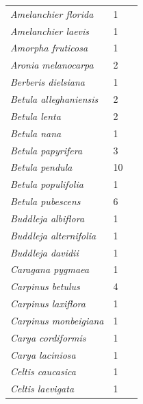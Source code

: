 \documentclass[11pt]{article}
\begin{document}
\begin{longtable}{p{}p{}p{}}
  \emph{Amelanchier florida} &   1 & \emph{\citep{zohner2016}} \\ 
  \emph{Amelanchier laevis} &   1 & \emph{\citep{zohner2016}} \\ 
  \emph{Amorpha fruticosa} &   1 & \emph{\citep{Laube:2014a}} \\ 
  \emph{Aronia melanocarpa} &   2 & \emph{\citep{flynn2018,zohner2016}} \\ 
  \emph{Berberis dielsiana} &   1 & \emph{\citep{zohner2016}} \\ 
  \emph{Betula alleghaniensis} &   2 & \emph{\citep{Calme:1994aa,flynn2018}} \\ 
  \emph{Betula lenta} &   2 & \emph{\citep{flynn2018,zohner2016}} \\ 
  \emph{Betula nana} &   1 & \emph{\citep{zohner2016}} \\ 
  \emph{Betula papyrifera} &   3 & \emph{\citep{flynn2018,man17,nanninga17}} \\ 
  \emph{Betula pendula} &  10 & \emph{\citep{Basler:2012,Heide:1993,Laube:2014a,Laube:2014b,Li:2005aa,Linkosalo:2006aa,Myking:1995,Myking:1998aa,Rinne:1997aa,Skuterud:1994aa}} \\ 
  \emph{Betula populifolia} &   1 & \emph{\citep{zohner2016}} \\ 
  \emph{Betula pubescens} &   6 & \emph{\citep{Caffarra:2011a,Caffarra:2011b,Heide:1993,Myking:1995,Myking:1997aa,Rinne:1994}} \\ 
  \emph{Buddleja albiflora} &   1 & \emph{\citep{zohner2016}} \\ 
  \emph{Buddleja alternifolia} &   1 & \emph{\citep{zohner2016}} \\ 
  \emph{Buddleja davidii} &   1 & \emph{\citep{zohner2016}} \\ 
  \emph{Caragana pygmaea} &   1 & \emph{\citep{zohner2016}} \\ 
  \emph{Carpinus betulus} &   4 & \emph{\citep{Heide:1993a,Laube:2014a,vitra17,zohner2016}} \\ 
  \emph{Carpinus laxiflora} &   1 & \emph{\citep{zohner2016}} \\ 
  \emph{Carpinus monbeigiana} &   1 & \emph{\citep{zohner2016}} \\ 
  \emph{Carya cordiformis} &   1 & \emph{\citep{zohner2016}} \\ 
  \emph{Carya laciniosa} &   1 & \emph{\citep{zohner2016}} \\ 
  \emph{Celtis caucasica} &   1 & \emph{\citep{zohner2016}} \\ 
  \emph{Celtis laevigata} &   1 & \emph{\citep{zohner2016}} \\ 

\end{longtable}
\end{document}
